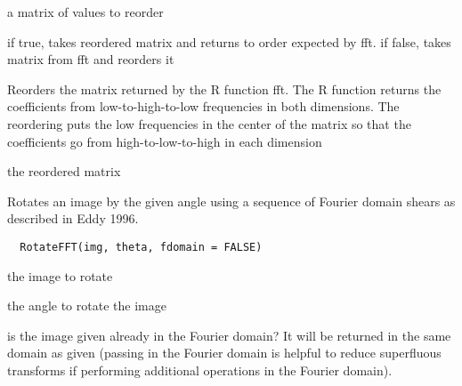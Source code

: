 \documentclass[a4paper]{book}
\begin{document}
%
\begin{Arguments}
\begin{ldescription}
\item[\code{mat}] a matrix of values to reorder

\item[\code{inverse}] if true, takes reordered matrix and
returns to order expected by fft. if false, takes matrix
from fft and reorders it
\end{ldescription}
\end{Arguments}
%
\begin{Details}\relax
Reorders the matrix returned by the R function fft.  The
R function returns the coefficients from
low-to-high-to-low frequencies in both dimensions.  The
reordering puts the low frequencies in the center of the
matrix so that the coefficients go from
high-to-low-to-high in each dimension
\end{Details}
%
\begin{Value}
the reordered matrix
\end{Value}
%
\begin{Description}\relax
Rotates an image by the given angle using a sequence of
Fourier domain shears as described in Eddy 1996.
\end{Description}
%
\begin{Usage}
\begin{verbatim}
  RotateFFT(img, theta, fdomain = FALSE)
\end{verbatim}
\end{Usage}
%
\begin{Arguments}
\begin{ldescription}
\item[\code{img}] the image to rotate

\item[\code{theta}] the angle to rotate the image

\item[\code{fdomain}] is the image given already in the Fourier
domain?  It will be returned in the same domain as given
(passing in the Fourier domain is helpful to reduce
superfluous transforms if performing additional
operations in the Fourier domain).
\end{ldescription}
\end{Arguments}
\end{document}
